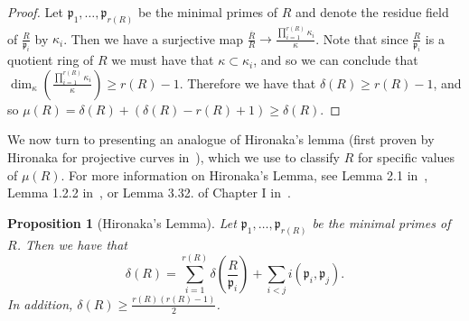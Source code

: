 \documentclass{article}
\newtheorem{proposition}[theorem]{Proposition}
\numberwithin{theorem}{section}
\begin{document}
\begin{proof}
     Let $\mathfrak{p}_1, \dots, \mathfrak{p}_{r(R)}$ be the minimal primes of $R$ and denote the residue field of $\frac{R}{\mathfrak{p}_i}$ by $\kappa_i$. Then we have a surjective map $\frac{\overline{R}}{R} \to \frac{\prod_{i=1}^{r(R)} \kappa_i}{\kappa}$. Note that since $\frac{R}{\mathfrak{p}_i}$ is a quotient ring of $R$ we must have that $\kappa \subset \kappa_i$, and so we can conclude that $\dim_\kappa \left(\frac{\prod_{i=1}^{r(R)}  \kappa_i}{\kappa}\right) \geq r(R)-1$. Therefore we have that $\delta(R) \geq r(R)-1$, and so $\mu(R) = \delta(R) + (\delta(R)-r(R)+1) \geq \delta(R)$. 
\end{proof}



We now turn to presenting an analogue of Hironaka's lemma (first proven by Hironaka for projective curves in~\cite{hironaka1957arithmetic}), which we use to classify $R$ for specific values of $\mu(R)$. For more information on Hironaka's Lemma, see Lemma 2.1 in~\cite{campillo1983hamburger}, Lemma 1.2.2 in~\cite{buchweitz1980milnor}, or Lemma 3.32. of Chapter I in~\cite{greuel2007introduction}. 



\begin{proposition}[Hironaka's Lemma] \label{thm:branch}
    Let $\mathfrak{p}_1, \dots, \mathfrak{p}_{r(R)}$ be the minimal primes of $R$. Then we have that 
    \begin{equation*}
        \delta(R) = \sum_{i=1}^{r(R)}  \delta\left(\frac{R}{\mathfrak{p}_i}\right) + \sum_{i <  j} i(\mathfrak{p}_i, \mathfrak{p}_j).
    \end{equation*}
    In addition, $\delta(R) \geq \frac{r(R)(r(R)-1)}{2}$. 
\end{proposition}
    
\end{document}
